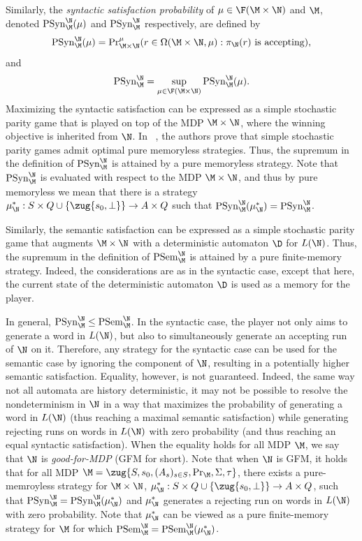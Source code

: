 \documentclass{lmcs}
\newcommand{\set}[1]{\{ #1 \}}
\begin{document}
Similarly, the \emph{syntactic satisfaction probability} of $\mu\in \F(\M\times \N)$ and $\M$, denoted $\mathrm{PSyn}^\N_\M(\mu)$ and $\mathrm{PSyn}^\N_{\M}$ respectively, are defined by
\[
\mathrm{PSyn}^\N_\M(\mu)={\Pr}_{\M\times \N}^\mu(r\in \Omega(\M\times \N,\mu) : \pi_\N(r) \mbox{ is accepting}),
\]
and
\[
\mathrm{PSyn}^\N_{\M}=\sup_{\mu\in \F(\M\times \N)}\mathrm{PSyn}^\N_\M(\mu).
\]
Maximizing the syntactic satisfaction can be expressed as a simple stochastic parity game that is played on top of the MDP $\M\times \N$, where the winning objective is inherited from $\N$. In ~\cite{CH03}, the authors prove that simple stochastic parity games admit optimal pure memoryless strategies. Thus, the supremum in the definition of $\mathrm{PSyn}^\N_{\M}$ is attained by a pure memoryless strategy. Note that $\mathrm{PSyn}^\N_{\M}$ is evaluated with respect to the MDP $\M\times \N$, and thus by pure memoryless we mean that there is a strategy $\mu^*_\N:S\times Q\cup\set{\zug{s_0,\bot}}\rightarrow A\times Q$ such that $\mathrm{PSyn}^\N_{\M}(\mu^*_\N)=\mathrm{PSyn}^\N_{\M}$.

Similarly, the semantic satisfaction can be expressed as a simple stochastic parity game that augments $\M\times\N$ with a deterministic automaton $\D$ for $L(\N)$. Thus, the supremum in the definition of $\mathrm{PSem}^\N_{\M}$ is attained by a pure finite-memory strategy. Indeed, the considerations are as in the syntactic case, except that here, the current state of the deterministic automaton $\D$ is used as a memory for the player.

In general, $\mathrm{PSyn}^\N_\M \leq \mathrm{PSem}^\N_\M$. In the syntactic case, the player not only aims to generate a word in $L(\N)$, but also to simultaneously generate an accepting run of $\N$ on it. Therefore, any strategy for the syntactic case can be used for the semantic case by ignoring the component of $\N$, resulting in a potentially higher semantic satisfaction. Equality, however, is not guaranteed. Indeed, the same way not all automata are history deterministic, it may not be possible to resolve the nondeterminism in $\N$ in a way that maximizes the probability of generating a word in $L(\N)$ (thus reaching a maximal semantic satisfaction) while generating rejecting runs on words in $L(\N)$ with zero probability (and thus reaching an equal syntactic satisfaction). When the equality holds for all MDP $\M$, we say that $\N$ is \emph{good-for-MDP} (GFM for short). Note that when $\N$ is GFM, it holds that for all MDP $\M=\zug{S,s_0,(A_s)_{s\in S},\Pr_{\M},\Sigma,\tau}$, there exists a pure-memroyless strategy for $\M\times \N$, $\mu^*_\N:S\times Q\cup\set{\zug{s_0,\bot}}\rightarrow A\times Q$, such that $\mathrm{PSyn}^\N_{\M}=\mathrm{PSyn}^\N_{\M}(\mu^*_\N)$ and $\mu^*_\N$ generates a rejecting run on words in $L(\N)$ with zero probability. Note that $\mu^*_\N$ can be viewed as a pure finite-memory strategy for $\M$ for which $\mathrm{PSem}^\N_{\M}=\mathrm{PSem}^\N_{\M}(\mu^*_\N)$.
\end{document}
